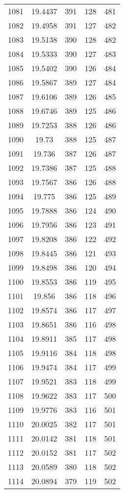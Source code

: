 \documentclass[12pt,a4paper]{article}
\begin{document}
\begin{tabular}{r|cccc}
	1081 & 19.4437 & 391 & 128 & 481 \\
	1082 & 19.4958 & 391 & 127 & 482 \\
	1083 & 19.5138 & 390 & 128 & 482 \\
	1084 & 19.5333 & 390 & 127 & 483 \\
	1085 & 19.5402 & 390 & 126 & 484 \\
	1086 & 19.5867 & 389 & 127 & 484 \\
	1087 & 19.6106 & 389 & 126 & 485 \\
	1088 & 19.6746 & 389 & 125 & 486 \\
	1089 & 19.7253 & 388 & 126 & 486 \\
	1090 & 19.73 & 388 & 125 & 487 \\
	1091 & 19.736 & 387 & 126 & 487 \\
	1092 & 19.7386 & 387 & 125 & 488 \\
	1093 & 19.7567 & 386 & 126 & 488 \\
	1094 & 19.775 & 386 & 125 & 489 \\
	1095 & 19.7888 & 386 & 124 & 490 \\
	1096 & 19.7956 & 386 & 123 & 491 \\
	1097 & 19.8208 & 386 & 122 & 492 \\
	1098 & 19.8445 & 386 & 121 & 493 \\
	1099 & 19.8498 & 386 & 120 & 494 \\
	1100 & 19.8553 & 386 & 119 & 495 \\
	1101 & 19.856 & 386 & 118 & 496 \\
	1102 & 19.8574 & 386 & 117 & 497 \\
	1103 & 19.8651 & 386 & 116 & 498 \\
	1104 & 19.8911 & 385 & 117 & 498 \\
	1105 & 19.9116 & 384 & 118 & 498 \\
	1106 & 19.9474 & 384 & 117 & 499 \\
	1107 & 19.9521 & 383 & 118 & 499 \\
	1108 & 19.9622 & 383 & 117 & 500 \\
	1109 & 19.9776 & 383 & 116 & 501 \\
	1110 & 20.0025 & 382 & 117 & 501 \\
	1111 & 20.0142 & 381 & 118 & 501 \\
	1112 & 20.0152 & 381 & 117 & 502 \\
	1113 & 20.0589 & 380 & 118 & 502 \\
	1114 & 20.0894 & 379 & 119 & 502 \\

\end{tabular}
\end{document}
